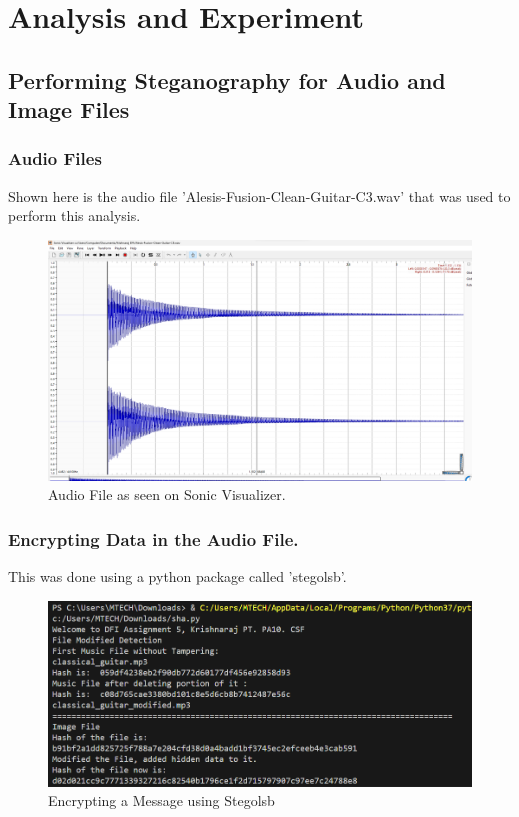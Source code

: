 \documentclass[11pt]{article}
\begin{document}
\section{Analysis and Experiment}

\subsection{Performing Steganography for Audio and Image Files}

\subsubsection{Audio Files}

Shown here is the audio file 'Alesis-Fusion-Clean-Guitar-C3.wav' that was used to perform this analysis. 

\begin{figure}[H]
    \centering
    \includegraphics[width=.95\textwidth]{audio file.png}
    \caption{Audio File as seen on Sonic Visualizer. }
\end{figure}

\subsubsection{Encrypting Data in the Audio File. }

This was done using a python package called 'stegolsb'.

\begin{figure}[H]
    \centering
    \includegraphics[width=.95\textwidth]{./image.png}
    \caption{Encrypting a Message using Stegolsb}
\end{figure}
\end{document}
